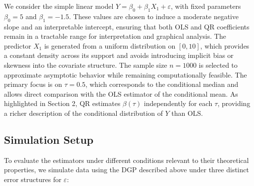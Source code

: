 \documentclass[fleqn,10pt]{latex/stylish_article} %
\begin{document}
We consider the simple linear model \(Y = \beta_0 + \beta_1 X_1 + \varepsilon\), with fixed parameters \(\beta_0 = 5\) and \(\beta_1 = -1.5\). These values are chosen to induce a moderate negative slope and an interpretable intercept, ensuring that both OLS and QR coefficients remain in a tractable range for interpretation and graphical analysis. The predictor \(X_1\) is generated from a uniform distribution on \([0,10]\), which provides a constant density across its support and avoids introducing implicit bias or skewness into the covariate structure. The sample size \(n = 1000\) is selected to approximate asymptotic behavior while remaining computationally feasible. The primary focus is on \(\tau = 0.5\), which corresponds to the conditional median and allows direct comparison with the OLS estimator of the conditional mean. As highlighted in Section 2, QR estimates \(\beta(\tau)\) independently for each \(\tau\), providing a richer description of the conditional distribution of \(Y\) than OLS.

\subsection{Simulation Setup}\label{simulation-setup}

To evaluate the estimators under different conditions relevant to their theoretical properties, we simulate data using the DGP described above under three distinct error structures for \(\varepsilon\):
\end{document}
